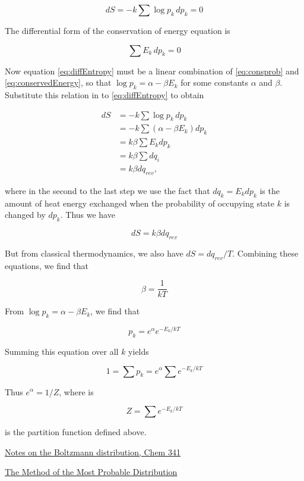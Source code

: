 \begin{equation}
\label{eq:diffEntropy}
 dS = -k \sum \log p_k\,  dp_k = 0
\end{equation}



The differential form of the conservation of energy equation is

\begin{equation}
\label{eq:dffConservedEnergy}
 \sum E_k\, d p_k = 0
\end{equation}

Now  equation \eqref{eq:diffEntropy} must be a linear combination of \eqref{eq:consprob}
and \eqref{eq:conservedEnergy}, so that $\log p_k = \alpha - \beta E_k$
for some constants $\alpha$ and $\beta$.  Substitute this relation in to \eqref{eq:diffEntropy} to obtain

\begin{align}
 dS & = -k \sum \log p_k\,  dp_k \\
      & = -k \sum (\alpha - \beta E_k) dp_k \\
      & = k\beta \sum E_k dp_k \\
     & = k\beta \sum dq_i \\
    & = k\beta dq_{rev},
\end{align}

where in the second to the last step we use the fact that $dq_k = E_k dp_k$  is the  amount of heat energy exchanged when the
probability of occupying state $k$ is changed by $dp_k$.  Thus we have

$$
dS = k\beta dq_{rev}
$$


But from classical thermodynamics, we also have $dS = dq_{rev}/T$.  Combining these equations, we find that

\begin{equation}
\beta = \frac{1}{kT}
\end{equation}

From $\log p_k = \alpha - \beta E_k$, we find that

\begin{equation}
p_k = e^\alpha e^{-E_k/kT}
\end{equation}

Summing this equation over all $k$ yields

\begin{equation}
1 = \sum p_k = e^\alpha \sum e^{-E_k/kT}
\end{equation}

Thus $e^\alpha = 1/Z$, where is

\begin{equation}
Z = \sum e^{-E_k/kT}
\end{equation}

is the partition function defined above.



\href{http://casegroup.rutgers.edu/lnotes/ccb341/boltzmann.pdf}{Notes on the Boltzmann distribution, Chem 341}

\href{http://www.physics.udel.edu/~glyde/PHYS813/Lectures/chapter_3.pdf}{The Method of the Most Probable Distribution}
